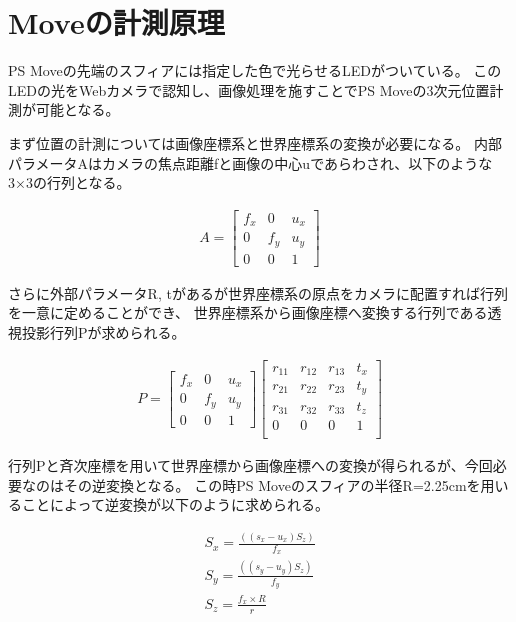\documentclass[11pt,a4j]{jsarticle}
\begin{document}



\section{Moveの計測原理}

PS Moveの先端のスフィアには指定した色で光らせるLEDがついている。
このLEDの光をWebカメラで認知し、画像処理を施すことでPS Moveの3次元位置計測が可能となる。

まず位置の計測については画像座標系と世界座標系の変換が必要になる。
内部パラメータAはカメラの焦点距離fと画像の中心uであらわされ、以下のような3×3の行列となる。

\begin{align*}
  A =
  \begin{bmatrix}
    f_x & 0 & u_x \\
    0 & f_y & u_y \\
    0 & 0 & 1
  \end{bmatrix}
\end{align*}

さらに外部パラメータR, tがあるが世界座標系の原点をカメラに配置すれば行列を一意に定めることができ、
世界座標系から画像座標へ変換する行列である透視投影行列Pが求められる。

\begin{align*}
  P =
  \begin{bmatrix}
    f_x & 0 & u_x \\
    0 & f_y & u_y \\
    0 & 0 & 1
  \end{bmatrix}
  \begin{bmatrix}
    r_{11} & r_{12} & r_{13} & t_{x} \\
    r_{21} & r_{22} & r_{23} & t_{y} \\
    r_{31} & r_{32} & r_{33} & t_{z} \\
    0 & 0 & 0 & 1 \\
  \end{bmatrix}
\end{align*}


行列Pと斉次座標を用いて世界座標から画像座標への変換が得られるが、今回必要なのはその逆変換となる。
この時PS Moveのスフィアの半径R=2.25cmを用いることによって逆変換が以下のように求められる。

\begin{align*}
  S_x = \frac{((s_x - u_x)S_z)}{f_x} \\
  S_y = \frac{((s_y - u_y)S_z)}{f_y} \\
  S_z = \frac{f_x \times R}{r}
\end{align*}
\end{document}
